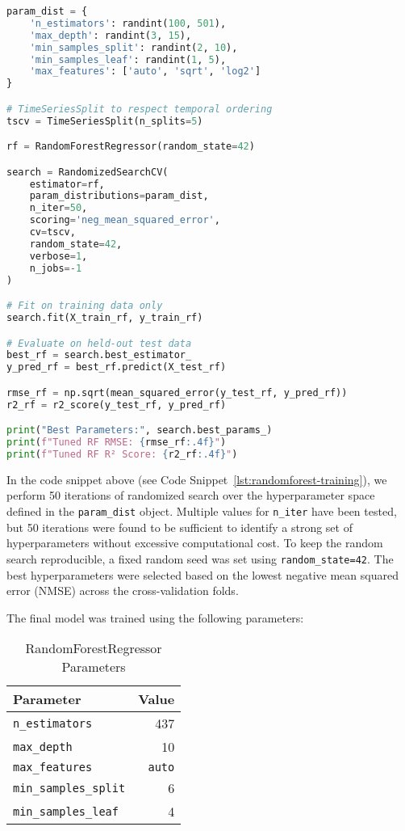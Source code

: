 \begin{lstlisting}[language=Python, caption={Training the Random Forest Model}, label={lst:randomforest-training}]
  param_dist = {
    'n_estimators': randint(100, 501),
    'max_depth': randint(3, 15),
    'min_samples_split': randint(2, 10),
    'min_samples_leaf': randint(1, 5),
    'max_features': ['auto', 'sqrt', 'log2']
}

# TimeSeriesSplit to respect temporal ordering
tscv = TimeSeriesSplit(n_splits=5)

rf = RandomForestRegressor(random_state=42)

search = RandomizedSearchCV(
    estimator=rf,
    param_distributions=param_dist,
    n_iter=50,
    scoring='neg_mean_squared_error',
    cv=tscv,
    random_state=42,
    verbose=1,
    n_jobs=-1
)

# Fit on training data only
search.fit(X_train_rf, y_train_rf)

# Evaluate on held-out test data
best_rf = search.best_estimator_
y_pred_rf = best_rf.predict(X_test_rf)

rmse_rf = np.sqrt(mean_squared_error(y_test_rf, y_pred_rf))
r2_rf = r2_score(y_test_rf, y_pred_rf)

print("Best Parameters:", search.best_params_)
print(f"Tuned RF RMSE: {rmse_rf:.4f}")
print(f"Tuned RF R² Score: {r2_rf:.4f}")
\end{lstlisting}

In the code snippet above (see Code Snippet~\ref{lst:randomforest-training}), we perform 50 iterations of randomized search over the hyperparameter space defined in the \texttt{param\_dist} object. 
Multiple values for \texttt{n\_iter} have been tested, but 50 iterations were found to be sufficient to identify a strong set of hyperparameters without excessive computational cost.
To keep the random search reproducible, a fixed random seed was set using \texttt{random\_state=42}.
The best hyperparameters were selected based on the lowest negative mean squared error (NMSE) across the cross-validation folds.

The final model was trained using the following parameters:
\begin{table}[H]
\centering
\caption{RandomForestRegressor Parameters}
\label{tab:randomforest-parameters}
\begin{tabular}{lr}
\toprule
\textbf{Parameter} & \textbf{Value} \\
\midrule
\texttt{n\_estimators} & 437 \\
\texttt{max\_depth} & 10 \\
\texttt{max\_features} & \texttt{auto} \\
\texttt{min\_samples\_split} & 6 \\
\texttt{min\_samples\_leaf} & 4 \\
\bottomrule
\end{tabular}
\end{table}

